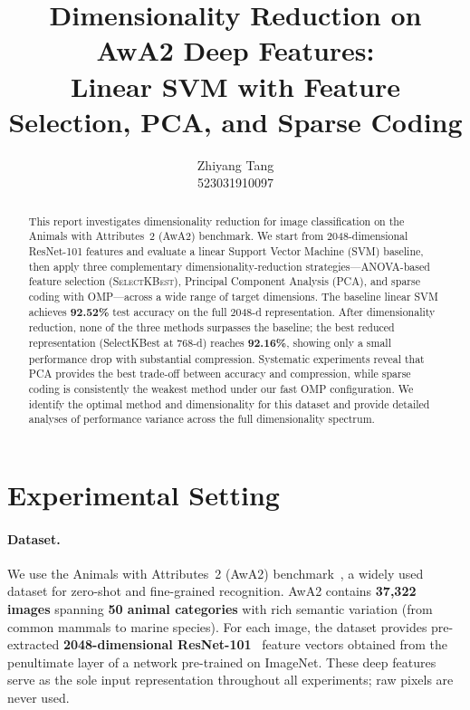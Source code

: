 \documentclass[10pt,letterpaper]{article}
\title{Dimensionality Reduction on AwA2 Deep Features:\\
Linear SVM with Feature Selection, PCA, and Sparse Coding}
\author{Zhiyang Tang\\
523031910097}
\begin{document}
\maketitle

\begin{abstract}
This report investigates dimensionality reduction for image classification
on the Animals with Attributes~2 (AwA2) benchmark.
We start from 2048-dimensional ResNet-101 features and evaluate a linear
Support Vector Machine (SVM) baseline, then apply three complementary
dimensionality-reduction strategies---ANOVA-based feature selection
(\textsc{SelectKBest}), Principal Component Analysis (PCA), and
sparse coding with OMP---across a wide range of target dimensions.
The baseline linear SVM achieves \textbf{92.52\%} test accuracy on the
full 2048-d representation.
After dimensionality reduction, none of the three methods surpasses the
baseline; the best reduced representation (SelectKBest at 768-d) reaches
\textbf{92.16\%}, showing only a small performance drop with substantial
compression.
Systematic experiments reveal that PCA provides the best trade-off between
accuracy and compression, while sparse coding is consistently the weakest
method under our fast OMP configuration.
We identify the optimal method and dimensionality for this dataset and
provide detailed analyses of performance variance across the full
dimensionality spectrum.
\end{abstract}

\section{Experimental Setting}
\label{sec:setting}

\paragraph{Dataset.}
We use the Animals with Attributes~2 (AwA2) benchmark~\cite{xian2019zero,
lampert2009learning}, a widely used dataset for zero-shot and
fine-grained recognition.
AwA2 contains \textbf{37,322 images} spanning \textbf{50 animal categories}
with rich semantic variation (from common mammals to marine species).
For each image, the dataset provides pre-extracted \textbf{2048-dimensional
ResNet-101}~\cite{he2016deep} feature vectors obtained from the penultimate
layer of a network pre-trained on ImageNet.
These deep features serve as the sole input representation throughout all
experiments; raw pixels are never used.
\end{document}
